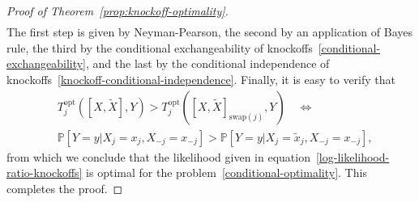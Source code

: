 \documentclass[12pt]{article}
\newtheorem{proposition}{Proposition}
\theoremstyle{definition}
\theoremstyle{remark}
\newcommand{\prx}{\bm X}
\newcommand{\srx}{X}
\newcommand{\sfx}{x}
\newcommand{\prz}{\bm Z}
\newcommand{\srz}{Z}
\newcommand{\srxk}{\widetilde X}
\newcommand{\sfxk}{\widetilde x}
\newcommand{\pry}{{\bm Y}}
\newcommand{\sry}{Y}
\newcommand{\sfy}{y}
\begin{document}
\begin{proof}[Proof of Theorem~\ref{prop:knockoff-optimality}]
\begin{equation*}
\begin{split}
	\end{split}
	\end{equation*}
	The first step is given by Neyman-Pearson, the second by an application of Bayes rule, the third by the conditional exchangeability of knockoffs~\eqref{conditional-exchangeability}, and the last by the conditional independence of knockoffs~\eqref{knockoff-conditional-independence}. Finally, it is easy to verify that
	\begin{equation*}
	\begin{split}
	&T_j^{\text{opt}}([\srx, \srxk], \sry) > T_j^{\text{opt}}([\srx, \srxk]_{\text{swap}(j)}, \sry) \quad \Longleftrightarrow \\
	& \mathbb P[\sry = \sfy|\srx_j = \sfx_j, \srx_{-j} = \sfx_{-j}] >  \mathbb P[\sry = \sfy|\srx_j = \sfxk_j, \srx_{-j} = \sfx_{-j}],
	\end{split}
	\end{equation*}
	from which we conclude that the likelihood given in equation~\eqref{log-likelihood-ratio-knockoffs} is optimal for the problem~\eqref{conditional-optimality}. This completes the proof.
\end{proof}

\end{document}
